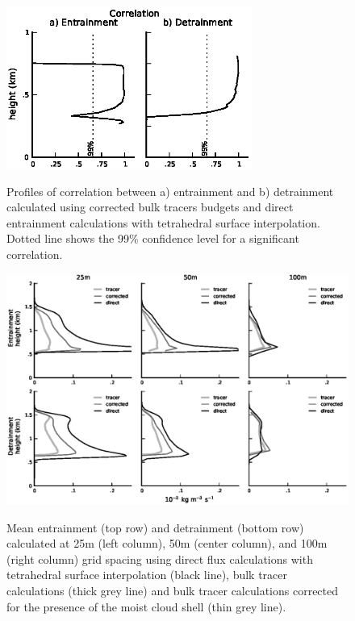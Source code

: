 \documentclass[12pt]{article}
\begin{document}
\begin{figure}[t]
  \noindent\includegraphics[width=19pc,angle=0]{./figures/correlations_core.eps}\\
  \caption{Profiles of correlation between a) entrainment and b) detrainment
calculated using corrected bulk tracers budgets and direct entrainment 
calculations with tetrahedral surface interpolation.  Dotted line shows the 
99\% confidence level for a significant correlation.}\label{fig:correlations}
\end{figure}

\begin{figure}[t]
  \noindent\includegraphics[width=40pc,angle=0]{./figures/resolution_dependence_core.eps}\\
  \caption{Mean entrainment (top row) and detrainment (bottom row) calculated
at 25m (left column), 50m (center column), and 100m (right column) grid 
spacing using direct flux calculations with tetrahedral surface interpolation 
(black line), bulk tracer calculations (thick grey line) and bulk tracer 
calculations corrected for the presence of the moist cloud shell (thin grey 
line).}\label{fig:resolution_dependence}
\end{figure}
\end{document}
